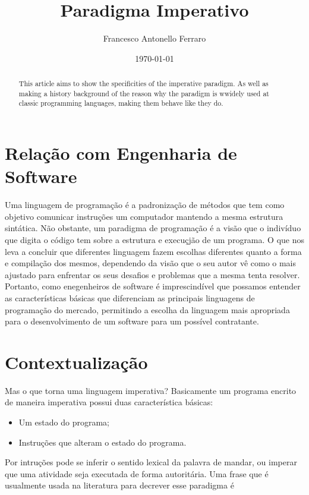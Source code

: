 \documentclass[11pt]{article}
\author{Francesco Antonello Ferraro}
\date{\today}
\title{Paradigma Imperativo}
\begin{document}
\maketitle
\begin{abstract}
This article aims to show the specificities of the imperative paradigm. As well as making a history background of the reason why the paradigm is wwidely used at classic programming languages, making them behave like they do.
\end{abstract}

\section{Relação com Engenharia de Software}
\label{sec:orgcf7c10f}

Uma linguagem de programação é a padronização de métodos que tem como objetivo comunicar instruções um computador mantendo a mesma estrutura sintática. Não obstante, um paradigma de programação é a visão que o indivíduo que digita o código tem sobre a estrutura e execuçjão de um programa. O que nos leva a concluir que diferentes linguagem fazem escolhas diferentes quanto a forma e compilação dos mesmos, dependendo da visão que o seu autor vê como o mais ajustado para enfrentar os seus desafios e problemas que a mesma tenta resolver. Portanto, como enegenheiros de software é imprescindível que possamos entender as características básicas que diferenciam as principais linguagens de programação do mercado, permitindo a escolha da linguagem mais apropriada para o desenvolvimento de um software para um possível contratante.

\section{Contextualização}
\label{sec:org2471387}

Mas o que torna uma linguagem imperativa? Basicamente um programa encrito de maneira imperativa possui duas característica básicas:

\begin{itemize}
\item Um estado do programa;
\item Instruções que alteram o estado do programa.
\end{itemize}

Por intruções pode se inferir o sentido lexical da palavra de mandar, ou imperar que uma atividade seja executada de forma autoritária. Uma frase que é usualmente  usada na literatura para decrever esse paradigma é
\end{document}
